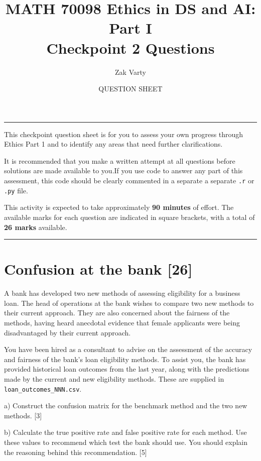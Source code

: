 \documentclass[a4paper, 11pt]{article}
\title{MATH 70098 Ethics in DS and AI: Part I \\ \textbf{Checkpoint 2 Questions}}
\author{Zak Varty}
\date{QUESTION SHEET}
\begin{document}
\maketitle

\hrule

This checkpoint question sheet is for you to assess your own progress through Ethics Part 1 and to identify any areas that need further clarifications. 

It is recommended that you make a written attempt at all questions before solutions are made available to you.If you use code to answer any part of this assessment, this code should be clearly commented in a separate a separate \texttt{.r} or \texttt{.py} file. 

This activity is expected to take approximately \textbf{90 minutes} of effort. The available marks for each question are indicated in square brackets, with a total of \textbf{26 marks} available.
 
\vspace{1em} 
 
\hrule


\section{Confusion at the bank [26] }

A bank has developed two new methods of assessing eligibility for a business loan. The head of operations at the bank wishes to compare two new methods to their current approach. They are also concerned about the fairness of the methods, having heard anecdotal evidence that female applicants were being disadvantaged by their current approach.

You have been hired as a consultant to advise on the assessment of the accuracy and fairness of the bank's loan eligibility methods. To assist you, the bank has provided historical loan outcomes from the last year, along with the predictions made by the current and new eligibility methods.  These are supplied in \texttt{loan\_outcomes\_NNN.csv}. 


a) Construct the confusion matrix for the benchmark method and the two new methods. [3]


b) Calculate the true positive rate and false positive rate for each method. Use these values to recommend which test the bank should use. You should explain the reasoning behind this recommendation. [5]
\end{document}
